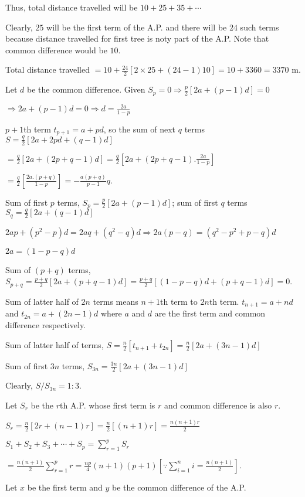   Thus, total distance travelled will be $10 + 25 + 35 + \cdots$

  Clearly, $25$ will be the first term of the A.P. and there will be $24$ such terms because distance travelled
  for first tree is noty part of the A.P. Note that common difference would be $10$.

  Total distance travelled $= 10 + \frac{24}{2}[2\times25 + (24 - 1)10] = 10 + 3360 = 3370$ m.
\item Let $d$ be the common difference. Given $S_p = 0 \Rightarrow \frac{p}{2}[2a + (p - 1)d] = 0$

  $\Rightarrow 2a + (p - 1)d = 0 \Rightarrow d = \frac{2a}{1 - p}$

  $p + 1$th term $t_{p + 1} = a + pd$, so the sum of next $q$ terms $S = \frac{q}{2}[2a + 2pd + (q - 1)d]$

  $= \frac{q}{2}[2a + (2p + q - 1)d] = \frac{q}{2}\left[2a + (2p + q - 1).\frac{2a}{1 - p}\right]$

  $= \frac{q}{2}\left[\frac{2a.(p + q)}{1 - p}\right] = -\frac{a(p + q)}{p - 1}q$.
\item Sum of first $p$ terms, $S_p = \frac{p}{2}[2a + (p - 1)d]$; sum of first $q$ terms $S_q = \frac{q}{2}[2a + (q - 1)d]$

  $2ap + (p^2 - p)d = 2aq + (q^2 - q)d \Rightarrow 2a(p - q) = (q^2 - p^2 + p - q)d$

  $2a = (1 - p - q)d$

  Sum of $(p + q)$ terms, $S_{p + q} = \frac{p + q}{2}[2a + (p + q - 1)d] = \frac{p + q}{2}[(1 - p - q)d + (p + q - 1)d] = 0$.
\item Sum of latter half of $2n$ terms means $n + 1$th term to $2n$th term. $t_{n + 1} = a + nd$ and $t_{2n} = a + (2n - 1)d$
  where $a$ and $d$ are the first term and common difference respectively.

  Sum of latter half of terms, $S = \frac{n}{2}[t_{n + 1} + t_{2n}] = \frac{n}{2}[2a + (3n - 1)d]$

  Sum of first $3n$ terms, $S_{3n} = \frac{3n}{2}[2a + (3n - 1)d]$

  Clearly, $S/S_{3n} = 1:3$.
\item Let $S_r$ be the $r$th A.P. whose first term is $r$ and common difference is also $r$.

  $S_r = \frac{n}{2}[2r + (n - 1)r] = \frac{n}{2}[(n + 1)r] = \frac{n(n + 1)r}{2}$

  $S_1 + S_2 + S_3 + \cdots + S_p = \displaystyle\sum_{r=1}^pS_r$

  $= \frac{n(n + 1)}{2}\displaystyle\sum_{r = 1}^pr = \frac{np}{4}(n + 1)(p + 1)\left[\because\displaystyle\sum_{i=1}^ni =
  \frac{n(n + 1)}{2}\right]$.
\item Let $x$ be the first term and $y$ be the common difference of the A.P.

